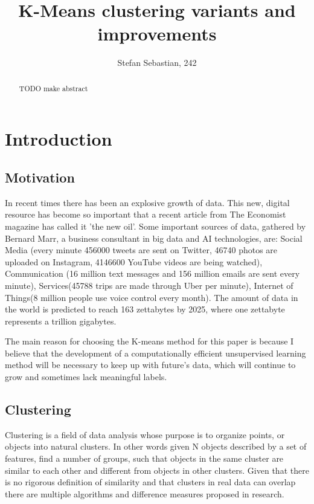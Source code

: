 \documentclass[12pt]{article}
\begin{document}
	\title{K-Means clustering variants and improvements}
	\author{Stefan Sebastian, 242}
	\maketitle
	
	\begin{abstract}
		TODO make abstract
	\end{abstract}

	\newpage
	\tableofcontents
	\newpage
	
	\section{Introduction}
	\subsection{Motivation}
	In recent times there has been an explosive growth of data. This new, digital resource has become so important that a recent article from The Economist magazine has called it 'the new oil'\cite{TheMostValuableResource}. Some important sources of data, gathered by Bernard Marr\cite{HowMuchDataDoWeCreateEveryDay}, a business consultant in big data and AI technologies, are: Social Media (every minute 456000 tweets are sent on Twitter, 46740 photos are uploaded on Instagram, 4146600 YouTube videos are being watched), Communication (16 million text messages and 156 million emails are sent every minute), Services(45788 trips are made through Uber per minute), Internet of Things(8 million people use voice control every month). The amount of data in the world is predicted to reach 163 zettabytes by 2025\cite{WhatWillWeDoWhenTheWorldsDataHits163Zettabytes}, where one zettabyte represents a trillion gigabytes.
	
	The main reason for choosing the K-means method for this paper is because I believe that the development of a computationally efficient unsupervised learning method will be necessary to keep up with future's data, which will continue to grow and sometimes lack meaningful labels.
	
	\subsection{Clustering}
	Clustering is a field of data analysis whose purpose is to organize points, or objects into natural clusters. In other words given N objects described by a set of features, find a number of groups, such that objects in the same cluster are similar to each other and different from objects in other clusters\cite{DataClustering50yearsBeyondKmeans}. Given that there is no rigorous definition of similarity and that clusters in real data can overlap there are multiple algorithms and difference measures proposed in research.
	
\end{document}
